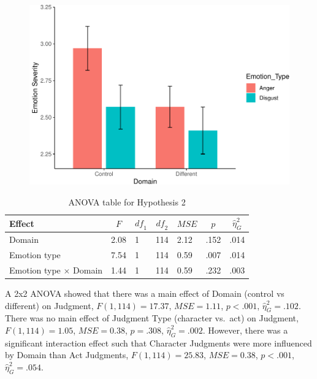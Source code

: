 \documentclass[man]{apa6}
\begin{document}
\begin{figure}
\centering
\includegraphics{APA_Report_files/figure-latex/unnamed-chunk-3-1.pdf}
\caption{}
\end{figure}

\begin{table}[tbp]
\begin{center}
\begin{threeparttable}
\caption{\label{tab:anothatable}ANOVA table for Hypothesis 2}
\begin{tabular}{lllllll}
\toprule
Effect & \multicolumn{1}{c}{$F$} & \multicolumn{1}{c}{$\mathit{df}_1$} & \multicolumn{1}{c}{$\mathit{df}_2$} & \multicolumn{1}{c}{$\mathit{MSE}$} & \multicolumn{1}{c}{$p$} & \multicolumn{1}{c}{$\hat{\eta}^2_G$}\\
\midrule
Domain & 2.08 & 1 & 114 & 2.12 & .152 & .014\\
Emotion type & 7.54 & 1 & 114 & 0.59 & .007 & .014\\
Emotion type $\times$ Domain & 1.44 & 1 & 114 & 0.59 & .232 & .003\\
\bottomrule
\end{tabular}
\end{threeparttable}
\end{center}
\end{table}

A 2x2 ANOVA showed that there was a main effect of Domain (control vs
different) on Judgment, \(F(1, 114) = 17.37\), \(\mathit{MSE} = 1.11\),
\(p < .001\), \(\hat{\eta}^2_G = .102\). There was no main effect of
Judgment Type (character vs.~act) on Judgment, \(F(1, 114) = 1.05\),
\(\mathit{MSE} = 0.38\), \(p = .308\), \(\hat{\eta}^2_G = .002\).
However, there was a significant interaction effect such that Character
Judgments were more influenced by Domain than Act Judgments,
\(F(1, 114) = 25.83\), \(\mathit{MSE} = 0.38\), \(p < .001\),
\(\hat{\eta}^2_G = .054\).
\end{document}
